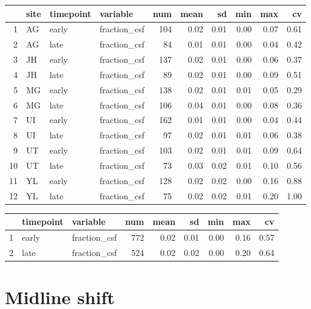 \documentclass[
]{article}
\begin{document}
\begin{table}[ht]
\centering
\begin{tabular}{rlllrrrrrr}
  \hline
 & site & timepoint & variable & num & mean & sd & min & max & cv \\ 
  \hline
1 & AG & early & fraction\_csf & 104 & 0.02 & 0.01 & 0.00 & 0.07 & 0.61 \\ 
  2 & AG & late & fraction\_csf &  84 & 0.01 & 0.01 & 0.00 & 0.04 & 0.42 \\ 
  3 & JH & early & fraction\_csf & 137 & 0.02 & 0.01 & 0.00 & 0.06 & 0.37 \\ 
  4 & JH & late & fraction\_csf &  89 & 0.02 & 0.01 & 0.00 & 0.09 & 0.51 \\ 
  5 & MG & early & fraction\_csf & 138 & 0.02 & 0.01 & 0.01 & 0.05 & 0.29 \\ 
  6 & MG & late & fraction\_csf & 106 & 0.04 & 0.01 & 0.00 & 0.08 & 0.36 \\ 
  7 & UI & early & fraction\_csf & 162 & 0.01 & 0.01 & 0.00 & 0.04 & 0.44 \\ 
  8 & UI & late & fraction\_csf &  97 & 0.02 & 0.01 & 0.01 & 0.06 & 0.38 \\ 
  9 & UT & early & fraction\_csf & 103 & 0.02 & 0.01 & 0.01 & 0.09 & 0.64 \\ 
  10 & UT & late & fraction\_csf &  73 & 0.03 & 0.02 & 0.01 & 0.10 & 0.56 \\ 
  11 & YL & early & fraction\_csf & 128 & 0.02 & 0.02 & 0.00 & 0.16 & 0.88 \\ 
  12 & YL & late & fraction\_csf &  75 & 0.02 & 0.02 & 0.01 & 0.20 & 1.00 \\ 
   \hline
\end{tabular}
\end{table}
\begin{table}[ht]
\centering
\begin{tabular}{rllrrrrrr}
  \hline
 & timepoint & variable & num & mean & sd & min & max & cv \\ 
  \hline
1 & early & fraction\_csf & 772 & 0.02 & 0.01 & 0.00 & 0.16 & 0.57 \\ 
  2 & late & fraction\_csf & 524 & 0.02 & 0.02 & 0.00 & 0.20 & 0.64 \\ 
   \hline
\end{tabular}
\end{table}

\hypertarget{midline-shift}{%
\section{Midline shift}\label{midline-shift}}
\end{document}
